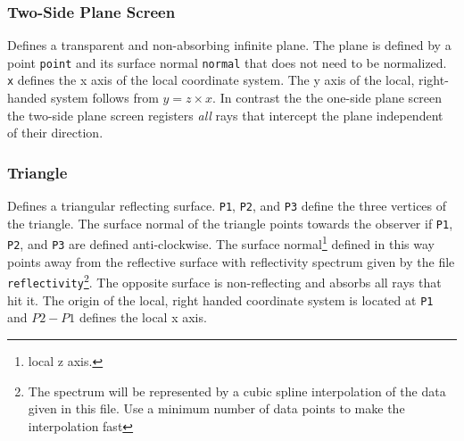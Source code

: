 \documentclass[10pt,a4paper,titlepage]{article}
\begin{document}
\subsubsection{Two-Side Plane Screen}






Defines a transparent and non-absorbing infinite plane. The plane is defined by a point {\tt point} and its surface normal {\tt normal} that does not need to be normalized. {\tt x} defines the x axis of the local coordinate system. The y axis of the local, right-handed system follows from $y=z \times x$. In contrast the the one-side plane screen the two-side plane screen registers \emph{all} rays that intercept the plane independent of their direction.


\subsubsection{Triangle}







Defines a triangular reflecting surface. {\tt P1}, {\tt P2}, and {\tt P3} define the three vertices of the triangle. The surface normal of the triangle points towards the observer if {\tt P1}, {\tt P2}, and {\tt P3} are defined anti-clockwise. The surface normal\footnote{local z axis.} defined in this way points away from the reflective surface with reflectivity spectrum given by the file {\tt reflectivity}\footnote{The spectrum will be represented by a cubic spline interpolation of the data given in this file. Use a minimum number of data points to make the interpolation fast}. The opposite surface is non-reflecting and absorbs all rays that hit it. The origin of the local, right handed coordinate system is located at {\tt P1} and $P2 - P1$ defines the local x axis. 
\end{document}
